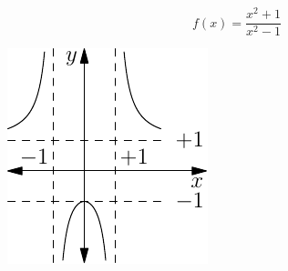 \documentclass{tufte-book} %
\begin{document}
\begin{equation*}
f(x)=\frac{x^2+1}{x^2-1}
\end{equation*}
\begin{marginfigure}
\includegraphics[width=0.75\linewidth]{graphics/algebra1.pdf}
\caption{$y=f(x)=\frac{x^2+1}{x^2-1}$}
\label{fig:algebra1}
\end{marginfigure}
\end{document}
